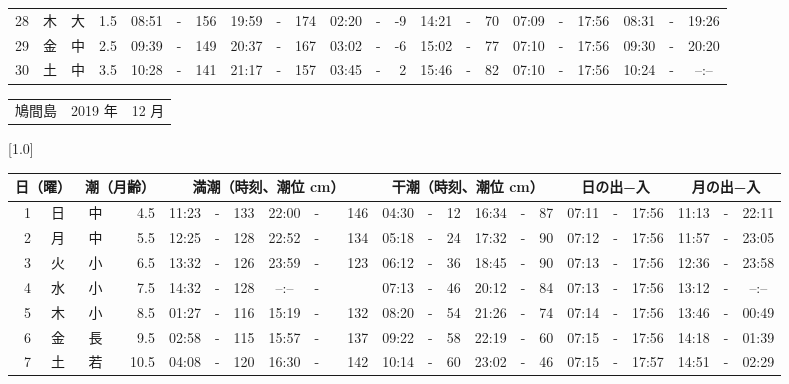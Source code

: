 \documentclass[12pt,a4j]{jsarticle}
\begin{document}
\begin{table}[htbp]
\begin{center}
{\begin{tabular}{|rc|cr|ccrccr|ccrccr|ccc|ccc|}
28 & 木 & 大 &  1.5 &  08:51 &-& 156 &  19:59 &-& 174 &  02:20 &-&  -9 &  14:21 &-&  70 & 07:09 & -& 17:56 & 08:31 & -& 19:26 \\
29 & 金 & 中 &  2.5 &  09:39 &-& 149 &  20:37 &-& 167 &  03:02 &-&  -6 &  15:02 &-&  77 & 07:10 & -& 17:56 & 09:30 & -& 20:20 \\
30 & 土 & 中 &  3.5 &  10:28 &-& 141 &  21:17 &-& 157 &  03:45 &-&   2 &  15:46 &-&  82 & 07:10 & -& 17:56 & 10:24 & -& --:-- \\
   \hline
   \end{tabular}}
   \end{center}
\end{table}
\newpage
 \begin{table}[htbp]
 \begin{center}
 \begin{tabular}{lcc}
 \LARGE{鳩間島}  & \large{2019 年} & \large{12 月} \\
 \end{tabular}
 \end{center}
 \begin{center}
    \scalebox{0.7}[1.0]{
    \begin{tabular}{|rc|cr|ccrccr|ccrccr|ccc|ccc|}
    \hline
    \multicolumn{2}{|c|}{日（曜）} & \multicolumn{2}{c|}{潮（月齢）} & \multicolumn{6}{c|}{満潮（時刻、潮位 cm）} & \multicolumn{6}{c|}{干潮（時刻、潮位 cm）} & \multicolumn{3}{c|}{日の出−入} &  \multicolumn{3}{c|}{月の出−入}\\
 \hline
 1 & 日 & 中 &  4.5 &  11:23 &-& 133 &  22:00 &-& 146 &  04:30 &-&  12 &  16:34 &-&  87 & 07:11 & -& 17:56 & 11:13 & -& 22:11 \\
 2 & 月 & 中 &  5.5 &  12:25 &-& 128 &  22:52 &-& 134 &  05:18 &-&  24 &  17:32 &-&  90 & 07:12 & -& 17:56 & 11:57 & -& 23:05 \\
 3 & 火 & 小 &  6.5 &  13:32 &-& 126 &  23:59 &-& 123 &  06:12 &-&  36 &  18:45 &-&  90 & 07:13 & -& 17:56 & 12:36 & -& 23:58 \\
 4 & 水 & 小 &  7.5 &  14:32 &-& 128 &  --:-- &-&~~~~~ &  07:13 &-&  46 &  20:12 &-&  84 & 07:13 & -& 17:56 & 13:12 & -& --:-- \\
 5 & 木 & 小 &  8.5 &  01:27 &-& 116 &  15:19 &-& 132 &  08:20 &-&  54 &  21:26 &-&  74 & 07:14 & -& 17:56 & 13:46 & -& 00:49 \\
 6 & 金 & 長 &  9.5 &  02:58 &-& 115 &  15:57 &-& 137 &  09:22 &-&  58 &  22:19 &-&  60 & 07:15 & -& 17:56 & 14:18 & -& 01:39 \\
 7 & 土 & 若 & 10.5 &  04:08 &-& 120 &  16:30 &-& 142 &  10:14 &-&  60 &  23:02 &-&  46 & 07:15 & -& 17:57 & 14:51 & -& 02:29 \\

\end{tabular}}
\end{center}
\end{table}
\end{document}

